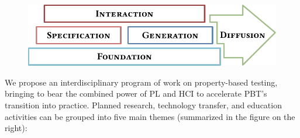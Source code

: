 \medskip

\begin{figure}
  \vspace*{-2ex}
  \centering
  \includegraphics[width=.6\textwidth]{assets/overview.pdf}
\end{figure}
%
We propose an interdisciplinary program of work on
{property-based testing}, bringing to
bear the combined power of PL and HCI to accelerate PBT's transition
into practice.
%
Planned research,
technology transfer, and education activities can be grouped into five main
themes (summarized in the figure on the right): \iflater{}\fi
%
